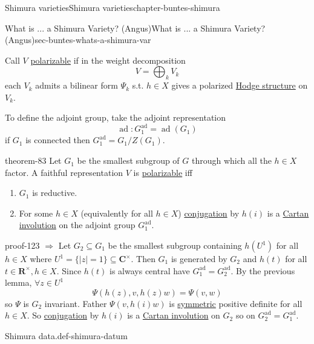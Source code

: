 \documentclass[oneside,10pt,]{book}
\numberwithin{equation}{section}
\newcommand{\RR}{\mathbf{R}}
\newcommand{\CC}{\mathbf{C}}
\DeclareMathOperator{\ad}{ad}
\begin{document}
\begin{chapterptx}{Shimura varieties}{}{Shimura varieties}{}{}{chapter-buntes-shimura}
\begin{sectionptx}{What is ... a Shimura Variety? (Angus)}{}{What is ... a Shimura Variety? (Angus)}{}{}{sec-buntes-whats-a-shimura-var}
\par
\hypertarget{p-1234}{}%
Call \(V\) \hyperref[def-polarizable]{polarizable} if in the weight decomposition%
\begin{equation*}
V = \bigoplus_k V_k
\end{equation*}
each \(V_k\) admits a bilinear form \(\Psi_k\) s.t. \(h \in X\) gives a polarized \hyperref[def-hodge-str]{Hodge structure} on \(V_k\).%
\par
\hypertarget{p-1235}{}%
To define the adjoint group, take the adjoint representation%
\begin{equation*}
\ad \colon G_1^{\ad} = \ad(G_1)
\end{equation*}
if \(G_1\) is connected then \(G_1^{\ad} = G_1 /Z(G_1)\).%
\begin{theorem}{}{}{theorem-83}%
\hypertarget{p-1236}{}%
Let \(G_1\) be the smallest subgroup of \(G\) through  which all the \(h \in X\) factor. A faithful representation \(V\) is \hyperref[def-polarizable]{polarizable} iff\leavevmode%
\begin{enumerate}
\item\hypertarget{li-298}{}\(G_1\) is reductive.%
\item\hypertarget{li-299}{}For some \(h \in X\) (equivalently for all \(h \in X\)) \hyperref[def-quat-alg-conj-trace-norm]{conjugation} by \(h(i)\) is a \hyperref[def-cartan-inv]{Cartan involution} on the adjoint group \(G_1^{\ad}\).%
\end{enumerate}
%
\end{theorem}
\begin{proofptx}{}{proof-123}
\hypertarget{p-1237}{}%
\(\Rightarrow\) Let \(G_2 \subseteq G_1\) be the smallest subgroup containing \(h(U^1)\) for all \(h \in X\) where \(U^1 = \{|z| = 1\} \subseteq \CC^\times\). Then \(G_1\) is generated by \(G_2\) and \(h(t)\) for all \(t \in \RR^\times, h \in X\). Since \(h(t)\) is always central have \(G_1^{\ad}=  G_2^{\ad}\). By the previous lemma, \(\forall z  \in U^1\)%
\begin{equation*}
\Psi(h(z), v, h(z) w) = \Psi(v,w)
\end{equation*}
so \(\Psi\) is \(G_2\) invariant. Father \(\Psi(v, h(i) w)\) is \hyperref[def-princ-pol]{symmetric} positive definite for all \(h \in X\). So \hyperref[def-quat-alg-conj-trace-norm]{conjugation} by \(h(i)\) is a \hyperref[def-cartan-inv]{Cartan involution} on \(G_2\) so on \(G_2^{\ad} = G_1^{\ad}\).%
\end{proofptx}
\begin{definition}{Shimura data.}{def-shimura-datum}%

\end{definition}
\end{sectionptx}
\end{chapterptx}
\end{document}
